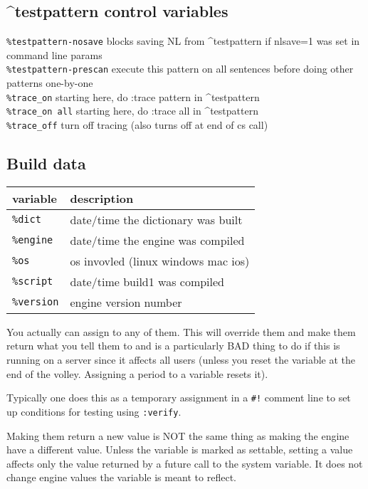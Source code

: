 \documentclass[]{article}
\begin{document}
\subsection{\^{}testpattern control
variables}\label{testpattern-control-variables}

\texttt{\%testpattern-nosave} \textbar{} blocks saving NL from
\^{}testpattern if nlsave=1 was set in command line params\\
\texttt{\%testpattern-prescan} \textbar{} execute this pattern on all
sentences before doing other patterns one-by-one\\
\texttt{\%trace\_on} \textbar{} starting here, do :trace pattern in
\^{}testpattern\\
\texttt{\%trace\_on\ all} \textbar{} starting here, do :trace all in
\^{}testpattern\\
\texttt{\%trace\_off} \textbar{} turn off tracing (also turns off at end
of cs call)

\subsection{Build data}\label{build-data}

\begin{longtable}[]{@{}ll@{}}
\toprule
variable & description\tabularnewline
\midrule
\endhead
\texttt{\%dict} & date/time the dictionary was built\tabularnewline
\texttt{\%engine} & date/time the engine was compiled\tabularnewline
\texttt{\%os} & os invovled (linux windows mac ios)\tabularnewline
\texttt{\%script} & date/time build1 was compiled\tabularnewline
\texttt{\%version} & engine version number\tabularnewline
\bottomrule
\end{longtable}

You actually can assign to any of them. This will override them and make
them return what you tell them to and is a particularly BAD thing to do
if this is running on a server since it affects all users (unless you
reset the variable at the end of the volley. Assigning a period to a
variable resets it).

Typically one does this as a temporary assignment in a \texttt{\#!}
comment line to set up conditions for testing using \texttt{:verify}.

Making them return a new value is NOT the same thing as making the
engine have a different value. Unless the variable is marked as
settable, setting a value affects only the value returned by a future
call to the system variable. It does not change engine values the
variable is meant to reflect.
\end{document}
